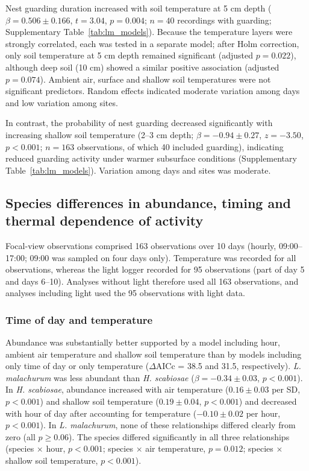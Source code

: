 \documentclass[11pt,a4paper]{article}
\begin{document}
Nest guarding duration increased with soil temperature at 5 cm depth ($\beta = 0.506 \pm 0.166$, $t = 3.04$, $p = 0.004$; $n = 40$ recordings with guarding; Supplementary Table~\ref{tab:lm_models}). Because the temperature layers were strongly correlated, each was tested in a separate model; after Holm correction, only soil temperature at 5 cm depth remained significant (adjusted $p = 0.022$), although deep soil (10 cm) showed a similar positive association (adjusted $p = 0.074$). Ambient air, surface and shallow soil temperatures were not significant predictors. Random effects indicated moderate variation among days and low variation among sites.

In contrast, the probability of nest guarding decreased significantly with increasing shallow soil temperature (2--3 cm depth; $\beta = -0.94 \pm 0.27$, $z = -3.50$, $p < 0.001$; $n = 163$ observations, of which 40 included guarding), indicating reduced guarding activity under warmer subsurface conditions (Supplementary Table~\ref{tab:lm_models}). Variation among days and sites was moderate.

\subsection{Species differences in abundance, timing and thermal dependence of activity}

Focal-view observations comprised 163 observations over 10 days (hourly, 09:00--17:00; 09:00 was sampled on four days only). Temperature was recorded for all observations, whereas the light logger recorded for 95 observations (part of day 5 and days 6--10). Analyses without light therefore used all 163 observations, and analyses including light used the 95 observations with light data.

\subsubsection{Time of day and temperature}

Abundance was substantially better supported by a model including hour, ambient air temperature and shallow soil temperature than by models including only time of day or only temperature ($\Delta$AICc = 38.5 and 31.5, respectively). \textit{L. malachurum} was less abundant than \textit{H. scabiosae} ($\beta = -0.34 \pm 0.03$, $p < 0.001$). In \textit{H. scabiosae}, abundance increased with air temperature ($0.16 \pm 0.03$ per SD, $p < 0.001$) and shallow soil temperature ($0.19 \pm 0.04$, $p < 0.001$) and decreased with hour of day after accounting for temperature ($-0.10 \pm 0.02$ per hour, $p < 0.001$). In \textit{L. malachurum}, none of these relationships differed clearly from zero (all $p \geq 0.06$). The species differed significantly in all three relationships (species $\times$ hour, $p < 0.001$; species $\times$ air temperature, $p = 0.012$; species $\times$ shallow soil temperature, $p < 0.001$).
\end{document}
